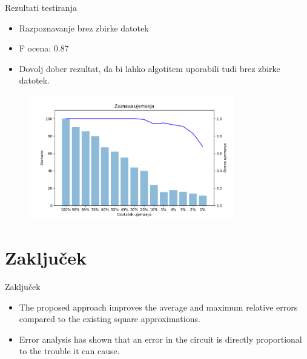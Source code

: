 \documentclass[xcolor=dvipsnames,compress]{beamer}
\begin{document}
\begin{frame}{Rezultati testiranja}
    \begin{itemize}
        \item Razpoznavanje brez zbirke datotek
        \item F ocena: 0.87
        \item Dovolj dober rezultat, da bi lahko algotitem uporabili tudi brez zbirke datotek.
    \end{itemize}
    
    \begin{figure}[ht!]
        \label{fig:subfigures}
        \begin{center}
            \includegraphics[width=0.8\textwidth]{figs/brez_courpusa.png}
        \end{center}
    \end{figure}
    
\end{frame}




\section{Zaključek}
\label{sec:zakljucek}

\begin{frame}{Zaključek}
\begin{itemize}
	\item The proposed approach improves the average and maximum relative errors compared to the existing square approximations.
	\pause
	\item Error analysis has shown that an error in the circuit is directly proportional to the trouble it can cause.
\end{itemize}
\end{frame}
\end{document}
